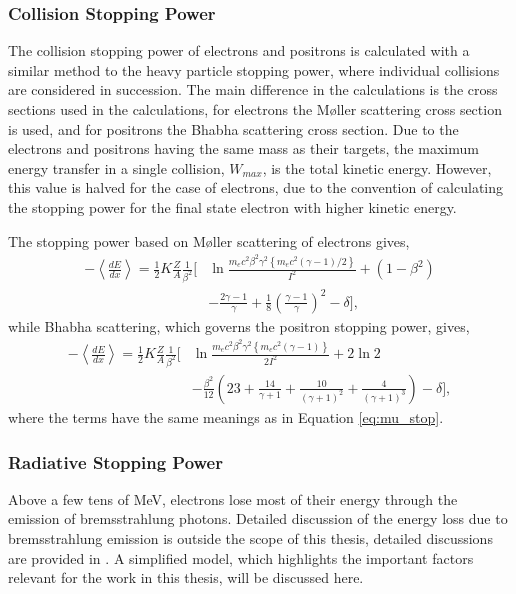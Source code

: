 \subsubsection*{Collision Stopping Power}
The collision stopping power of electrons and positrons is calculated with a
similar method to the heavy particle stopping power, where individual collisions
are considered in succession. The main difference in the calculations is the
cross sections used in the calculations, for electrons the M{\o}ller scattering
cross section is used, and for positrons the Bhabha scattering cross section. 
Due to the electrons and positrons having the same mass as their targets, the 
maximum energy transfer in a single collision, $W_{max}$, is the total kinetic 
energy. However, this value is halved for the case of electrons, due to the 
convention of calculating the stopping power for the final state electron with 
higher kinetic energy.

The stopping power based on M{\o}ller scattering of electrons gives,
\begin{align*}
	- \left< \frac{dE}{dx} \right> = \frac{1}{2} K \frac{Z}{A} \frac{1}{\beta^2}
	\bigg[ &\ln \frac{m_e c^2 \beta^2 \gamma^2 \left\{ m_e c^2 (\gamma - 1) / 2
	\right\} }{I^2} + (1 - \beta^2) \\
	&- \frac{2\gamma - 1}{\gamma} + \frac{1}{8} 
	\left(\frac{\gamma - 1}{\gamma}\right)^2 - \delta \bigg],
\end{align*}
while Bhabha scattering, which governs the positron stopping power, gives,
\begin{align*}
	- \left< \frac{dE}{dx} \right> = \frac{1}{2} K \frac{Z}{A} \frac{1}{\beta^2}
	\bigg[ &\ln \frac{m_e c^2 \beta^2 \gamma^2 \left\{ m_e c^2 (\gamma - 1) 
	\right\} }{2 I^2} 
	+ 2 \ln 2  \\ &-\frac{\beta^2}{12} \left(23 + \frac{14}{\gamma + 1} +
	\frac{10}{(\gamma + 1)^2} + \frac{4}{(\gamma + 1)^3}\right) - \delta \bigg],
\end{align*}
where the terms have the same meanings as in Equation 
\ref{eq:mu_stop}\cite{PhysRevD.98.030001}.

\subsubsection*{Radiative Stopping Power}
Above a few tens of MeV, electrons lose most of their energy through the 
emission of bremsstrahlung photons. Detailed discussion of the energy loss due
to bremsstrahlung emission is outside the scope of this thesis, detailed
discussions are provided in \cite{PhysRevD.98.030001, Tsai:1973py}. A simplified
model, which highlights the important factors relevant for the work in this 
thesis, will be discussed here.

